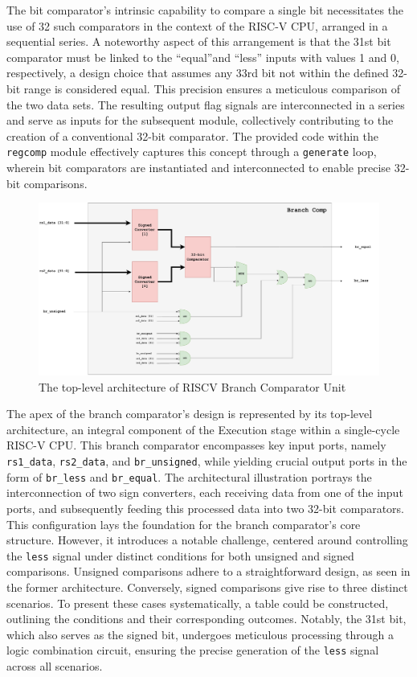\documentclass[12pt,a4paper,oneside]{book} %
\begin{document}
The bit comparator's intrinsic capability to compare a single bit necessitates the use of 32 such comparators in the context of the RISC-V CPU, arranged in a sequential series. A noteworthy aspect of this arrangement is that the 31st bit comparator must be linked to the ``equal''and ``less'' inputs with values 1 and 0, respectively, a design choice that assumes any 33rd bit not within the defined 32-bit range is considered equal. This precision ensures a meticulous comparison of the two data sets. The resulting output flag signals are interconnected in a series and serve as inputs for the subsequent module, collectively contributing to the creation of a conventional 32-bit comparator. The provided code within the \texttt{regcomp} module effectively captures this concept through a \texttt{generate} loop, wherein bit comparators are instantiated and interconnected to enable precise 32-bit comparisons.
 \begin{figure}[H]
    \begin{center}
    \includegraphics[trim=0cm 0cm 0cm 0cm,clip,width=\textwidth]{images/milestone2-brcomp.drawio.pdf}
    \caption{The top-level architecture of RISCV Branch Comparator Unit}
    \end{center}
\end{figure}
The apex of the branch comparator's design is represented by its top-level architecture, an integral component of the Execution stage within a single-cycle RISC-V CPU. This branch comparator encompasses key input ports, namely  \texttt{rs1\_data}, \texttt{rs2\_data}, and \texttt{br\_unsigned}, while yielding crucial output ports in the form of \texttt{br\_less} and \texttt{br\_equal}. The architectural illustration portrays the interconnection of two sign converters, each receiving data from one of the input ports, and subsequently feeding this processed data into two 32-bit comparators. This configuration lays the foundation for the branch comparator's core structure. However, it introduces a notable challenge, centered around controlling the \texttt{less} signal under distinct conditions for both unsigned and signed comparisons. Unsigned comparisons adhere to a straightforward design, as seen in the former architecture. Conversely, signed comparisons give rise to three distinct scenarios. To present these cases systematically, a table could be constructed, outlining the conditions and their corresponding outcomes. Notably, the 31st bit, which also serves as the signed bit, undergoes meticulous processing through a logic combination circuit, ensuring the precise generation of the \texttt{less} signal across all scenarios.
\end{document}

